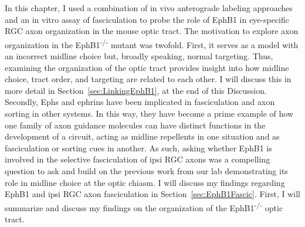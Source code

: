 In this chapter, I used a combination of in vivo anterograde labeling approaches and an in vitro assay of fasciculation to probe the role of EphB1 in eye-specific RGC axon organization in the mouse optic tract.
The motivation to explore axon organization in the EphB1\textsuperscript{-/-} mutant was twofold.
First, it serves as a model with an incorrect midline choice but, broadly speaking, normal targeting.
Thus, examining the organization of the optic tract provides insight into how midline choice, tract order, and targeting are related to each other.
I will discuss this in more detail in Section~\ref{sec:LinkingEphB1}, at the end of this Discussion.
Secondly, Ephs and ephrins have been implicated in fasciculation and axon sorting in other systems.
In this way, they have become a prime example of how one family of axon guidance molecules can have distinct functions in the development of a circuit, acting as midline repellents in one situation and as fasciculation or sorting cues in another.
As such, asking whether EphB1 is involved in the selective fasciculation of ipsi RGC axons was a compelling question to ask and build on the previous work from our lab demonstrating its role in midline choice at the optic chiasm.
I will discuss my findings regarding EphB1 and ipsi RGC axon fasciculation in Section~\ref{sec:EphB1Fascic}.
First, I will summarize and discuss my findings on the organization of the EphB1\textsuperscript{-/-} optic tract.